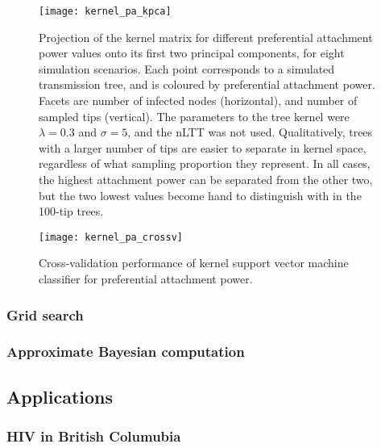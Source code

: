 \begin{figure}[ht]
  \centering
  \label{fig:pakpca}
  \texttt{[image: kernel\_pa\_kpca]}
  \caption[Projection of kernel matrix for different attachment power values
  onto its first two principal components]{
    Projection of the kernel matrix for different preferential attachment power
    values onto its first two principal components, for eight simulation
    scenarios. Each point corresponds to a simulated transmission tree, and is
    coloured by preferential attachment power. Facets are number of infected
    nodes (horizontal), and number of sampled tips (vertical). The parameters
    to the tree kernel were $\lambda = 0.3$ and $\sigma = 5$, and the nLTT was
    not used. Qualitatively, trees with a larger number of tips are easier to
    separate in kernel space, regardless of what sampling proportion they
    represent. In all cases, the highest attachment power can be separated from
    the other two, but the two lowest values become hand to distinguish with in
    the 100-tip trees.
  }
\end{figure}

\begin{figure}[ht]
  \centering
  \label{fig:pacrossv}
  \texttt{[image: kernel\_pa\_crossv]}
  \caption[Cross-validation performance of kernel support vector machine
  classifier for preferential attachment power]{
    Cross-validation performance of kernel support vector machine classifier
    for preferential attachment power.
  }
\end{figure}

\subsubsection{Grid search}

\subsubsection{Approximate Bayesian computation}

\subsection{Applications}

\subsubsection{HIV in British Columubia}
